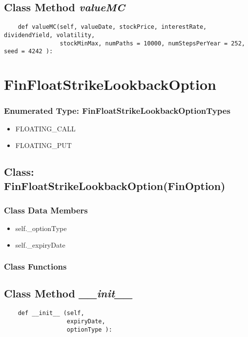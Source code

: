 \documentclass[twoside,11pt]{book}
\begin{document}
\subsection{Class Method {\it valueMC}}


\begin{lstlisting}
    def valueMC(self, valueDate, stockPrice, interestRate, dividendYield, volatility, 
                stockMinMax, numPaths = 10000, numStepsPerYear = 252, seed = 4242 ):
\end{lstlisting}

\newpage
\section{FinFloatStrikeLookbackOption}

\subsubsection{Enumerated Type: FinFloatStrikeLookbackOptionTypes}
\begin{itemize}
\item{FLOATING\_CALL}
\item{FLOATING\_PUT}
\end{itemize}

\subsection{Class: FinFloatStrikeLookbackOption(FinOption)}


\subsubsection{Class Data Members}
\begin{itemize}
\item{self.\_optionType}
\item{self.\_expiryDate}
\end{itemize}

\subsubsection{Class Functions}

\subsection{Class Method {\it \_\_init\_\_ }}


\begin{lstlisting}
    def __init__ (self,
                  expiryDate,
                  optionType ):
\end{lstlisting}
\end{document}
